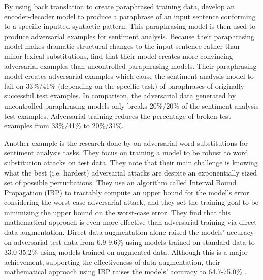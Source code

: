By using back translation to create paraphrased training data, \cite{paraphraseadver} develop an encoder-decoder model to produce a paraphrase of an input sentence conforming to a specific inputted syntactic pattern. This paraphrasing model is then used to produce adversarial examples for sentiment analysis. Because their paraphrasing model makes dramatic structural changes to the input sentence rather than minor lexical substitutions, \cite{paraphraseadver} find that their model creates more convincing adversarial examples than uncontrolled paraphrasing models. Their paraphrasing model creates adversarial examples which cause the sentiment analysis model to fail on 33\%/41\% (depending on the specific task) of paraphrases of originally successful test examples. In comparison, the adversarial data  generated by uncontrolled paraphrasing models only breaks 20\%/20\% of the sentiment analysis test examples. Adversarial training reduces the percentage of broken test examples from 33\%/41\% to 20\%/31\%.


Another example is the research done by \cite{certifiedrobustness} on adversarial word substitutions for sentiment analysis tasks. They focus on training a model to be robust to word substitution attacks on test data. They note that their main challenge is knowing what the best (i.e. hardest) adversarial attacks are despite an exponentially sized set of possible perturbations. They use an algorithm called Interval Bound Propagation (IBP) to tractably compute an upper bound for the model's error considering the worst-case adversarial attack, and they set the training goal to be minimizing the upper bound on the worst-case error. They find that this mathematical approach is even more effective than adversarial training via direct data augmentation. Direct data augmentation alone raised the models' accuracy on adversarial test data from 6.9-9.6\% using models trained on standard data to 33.0-35.2\% using models trained on augmented data. Although this is a major achievement, supporting the effectiveness of data augmentation, their mathematical approach using IBP raises the models' accuracy to 64.7-75.0\% \citep{certifiedrobustness}.

